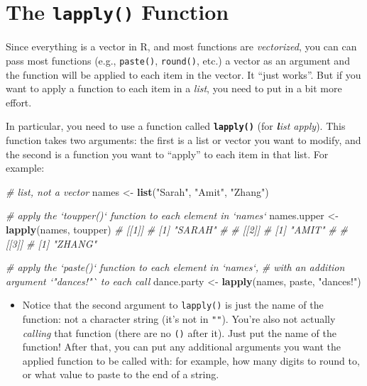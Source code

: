 \documentclass[]{book}
\newenvironment{Shaded}{\begin{snugshade}}{\end{snugshade}}
\newcommand{\KeywordTok}[1]{\textcolor[rgb]{0.13,0.29,0.53}{\textbf{#1}}}
\newcommand{\StringTok}[1]{\textcolor[rgb]{0.31,0.60,0.02}{#1}}
\newcommand{\CommentTok}[1]{\textcolor[rgb]{0.56,0.35,0.01}{\textit{#1}}}
\newcommand{\NormalTok}[1]{#1}
\providecommand{\tightlist}{%
  \setlength{\itemsep}{0pt}\setlength{\parskip}{0pt}}
\theoremstyle{definition}
\theoremstyle{definition}
\theoremstyle{remark}
\begin{document}
\section{\texorpdfstring{The \texttt{lapply()}
Function}{The lapply() Function}}\label{the-lapply-function}

Since everything is a vector in R, and most functions are
\emph{vectorized}, you can can pass most functions (e.g.,
\texttt{paste()}, \texttt{round()}, etc.) a vector as an argument and
the function will be applied to each item in the vector. It ``just
works''. But if you want to apply a function to each item in a
\emph{list}, you need to put in a bit more effort.

In particular, you need to use a function called
\textbf{\texttt{lapply()}} (for \emph{\textbf{l}ist apply}). This
function takes two arguments: the first is a list or vector you want to
modify, and the second is a function you want to ``apply'' to each item
in that list. For example:

\begin{Shaded}
\begin{Highlighting}[]
\CommentTok{# list, not a vector}
\NormalTok{names <-}\StringTok{ }\KeywordTok{list}\NormalTok{(}\StringTok{"Sarah"}\NormalTok{, }\StringTok{"Amit"}\NormalTok{, }\StringTok{"Zhang"}\NormalTok{)}

\CommentTok{# apply the `toupper()` function to each element in `names`}
\NormalTok{names.upper <-}\StringTok{ }\KeywordTok{lapply}\NormalTok{(names, toupper)}
            \CommentTok{# [[1]]}
            \CommentTok{# [1] "SARAH"}
            \CommentTok{#}
            \CommentTok{# [[2]]}
            \CommentTok{# [1] "AMIT"}
            \CommentTok{#}
            \CommentTok{# [[3]]}
            \CommentTok{# [1] "ZHANG"}

\CommentTok{# apply the `paste()` function to each element in `names`,}
\CommentTok{# with an addition argument `"dances!"` to each call}
\NormalTok{dance.party <-}\StringTok{ }\KeywordTok{lapply}\NormalTok{(names, paste, }\StringTok{"dances!"}\NormalTok{)}
\end{Highlighting}
\end{Shaded}

\begin{itemize}
\tightlist
\item
  Notice that the second argument to \texttt{lapply()} is just the name
  of the function: not a character string (it's not in \texttt{""}).
  You're also not actually \emph{calling} that function (there are no
  \texttt{()} after it). Just put the name of the function! After that,
  you can put any additional arguments you want the applied function to
  be called with: for example, how many digits to round to, or what
  value to paste to the end of a string.
\end{itemize}
\end{document}
